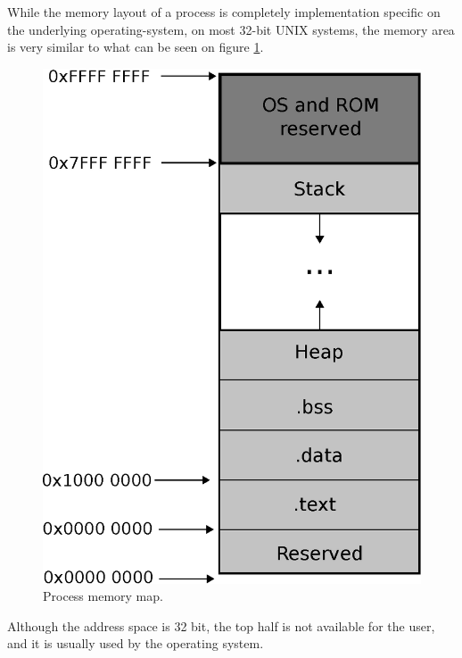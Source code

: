 While the memory layout of a process is completely implementation specific on
the underlying operating-system, on most 32-bit UNIX systems, the memory area is very
similar to what can be seen on figure \ref{fig:memory_layout}.
\begin{figure}[H]
	\centering
	\includegraphics[scale=0.40]{cpu_architecture/memory_layout.eps}
	\caption{Process memory map.}
	\label{fig:memory_layout}
\end{figure}

Although the address space is 32 bit, the top half is not available for the user,
and it is usually used by the operating system\cite{memory_layout}.

